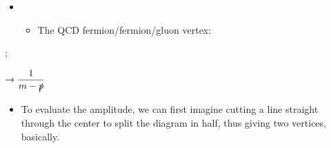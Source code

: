 \begin{itemize}
    \item[]
    \begin{itemize}
        \item The QCD fermion/fermion/gluon vertex:
    \end{itemize}
\end{itemize}

\begin{center}
\begin{minipage}{0.4\textwidth}
    \begin{flushright}
        ;
        \end{flushright}
    \end{minipage}\hspace*{1em}
    \begin{minipage}{0.4\textwidth}
        \begin{flushleft}
            $\displaystyle\rightarrow \frac{1}{m-\slashed{p}}$
        \end{flushleft}
    \end{minipage}
\end{center}
  

\begin{itemize}
    \item To evaluate the amplitude, we can first imagine cutting a line straight through the center to split the diagram in half, thus giving two vertices, basically.
\end{itemize}


